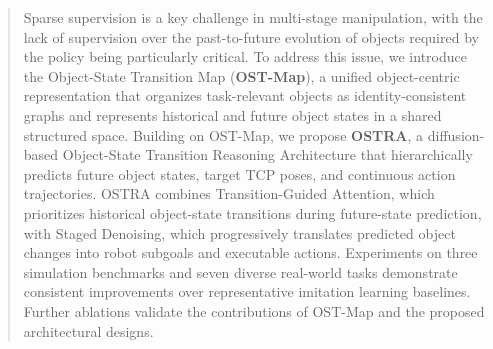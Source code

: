 \begin{abstract}
Sparse supervision is a key challenge in multi-stage manipulation, with the lack of supervision over the past-to-future evolution of objects required by the policy being particularly critical. To address this issue, we introduce the Object-State Transition Map (\textbf{OST-Map}), a unified object-centric representation that organizes task-relevant objects as identity-consistent graphs and represents historical and future object states in a shared structured space. Building on OST-Map, we propose \textbf{OSTRA}, a diffusion-based Object-State Transition Reasoning Architecture that hierarchically predicts future object states, target TCP poses, and continuous action trajectories. OSTRA combines Transition-Guided Attention, which prioritizes historical object-state transitions during future-state prediction, with Staged Denoising, which progressively translates predicted object changes into robot subgoals and executable actions. Experiments on three simulation benchmarks and seven diverse real-world tasks demonstrate consistent improvements over representative imitation learning baselines. Further ablations validate the contributions of OST-Map and the proposed architectural designs.
\end{abstract}
